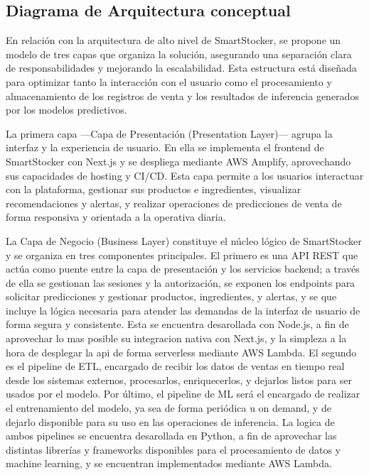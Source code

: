 \subsection{Diagrama de Arquitectura conceptual}\label{sec:arquitectura-conceptual}
En relación con la arquitectura de alto nivel de SmartStocker, se propone un modelo de tres capas que organiza la solución, asegurando una separación clara de responsabilidades y mejorando la escalabilidad. Esta estructura está diseñada para optimizar tanto la interacción con el usuario como el procesamiento y almacenamiento de los registros de venta y los resultados de inferencia generados por los modelos predictivos.

La primera capa —Capa de Presentación (Presentation Layer)— agrupa la interfaz y la experiencia de usuario. En ella se implementa el frontend de SmartStocker con Next.js y se despliega mediante AWS Amplify, aprovechando sus capacidades de hosting y CI/CD. Esta capa permite a los usuarios interactuar con la plataforma, gestionar sus productos e ingredientes, visualizar recomendaciones y alertas, y realizar operaciones de predicciones de venta de forma responsiva y orientada a la operativa diaria.

La Capa de Negocio (Business Layer) constituye el núcleo lógico de SmartStocker y se organiza en tres componentes principales. El primero es una API REST que actúa como puente entre la capa de presentación y los servicios backend; a través de ella se gestionan las sesiones y la autorización, se exponen los endpoints para solicitar predicciones y gestionar productos, ingredientes, y alertas, y se que incluye la lógica necesaria para atender las demandas de la interfaz de usuario de forma segura y consistente. Esta se encuentra desarollada con Node.js, a fin de aprovechar lo mas posible su integracion nativa con Next.js, y la simpleza a la hora de desplegar la api de forma serverless mediante AWS Lambda. El segundo es el pipeline de ETL, encargado de recibir los datos de ventas en tiempo real desde los sistemas externos, procesarlos, enriquecerlos, y dejarlos listos para ser usados por el modelo. Por último, el pipeline de ML será el encargado de realizar el entrenamiento del modelo, ya sea de forma periódica u on demand, y de dejarlo disponible para su uso en las operaciones de inferencia. La logica de ambos pipelines se encuentra desarollada en Python, a fin de aprovechar las distintas librerías y frameworks disponibles para el procesamiento de datos y machine learning, y se encuentran implementados mediante AWS Lambda.

